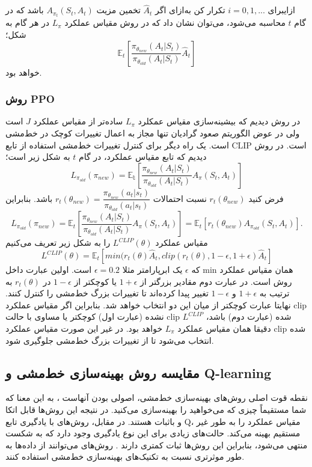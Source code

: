 ‌ازای{برای 
	$i=0,1,...$
	 تکرار کن}
‌به‌ازای
اگر $\hat{A}_t$ تخمین مزیت 
$A_{\pi_t}(S_t, A_t)$
باشد که در گام $t$ محاسبه می‌شود، می‌توان نشان داد که در روش
  مقیاس عملکرد $L_\pi$ در هر گام به شکل؛
$$\mathbb{E}_t\left[\dfrac{\pi_{\theta_{new}}(A_t| S_t)}{\pi_{\theta_{old}}(A_t|S_t)} \hat{A}_t \right]$$خواهد بود.
\subsubsection{روش PPO}
در روش  دیدیم که بیشینه‌سازی مقیاس عمکلرد $L_\pi$ ساده‌تر از مقیاس عملکرد $J$ است ولی در عوض الگوریتم صعود گرادیان تنها مجاز به اعمال تغییرات کوچک در خط‌مشی است. یک راه دیگر برای کنترل تغییرات خط‌مشی استفاده از تابع CLIP است. در روش
  دیدیم که تابع مقیاس عملکرد، در گام $t$ به شکل زیر است؛
$$L_{\pi_{old}}(\pi_{new}) = \mathbb{E_t}\left[\dfrac{\pi_{\theta_{new}}(A_t| S_t)}{\pi_{\theta_{old}}(A_t|S_t)} A_{\pi}(S_t, A_t)\right]$$
فرض کنید 
$r_t(\theta_{new})$
 نسبت احتمالات 
$r_t(\theta_{new}) = \dfrac{\pi_{\theta_{new}}(a_t|s_t)}{\pi_{\theta_{old}}(a_t|s_t)}$ باشد. بنابراین
$$L_{\pi_{old}}(\pi_{new}) = \mathbb{E}_t\left[\dfrac{\pi_{\theta_{new}}(A_t| S_t)}{\pi_{\theta_{old}}(A_t|S_t)} A_{\pi}(S_t, A_t)\right] = \mathbb{E}_t\left[r_t(\theta_{new}) A_{\pi_{old}}(S_t,A_t)\right].$$ مقیاس عملکرد  $L^{CLIP}(\theta)$ را به شکل زیر تعریف می‌کنیم
$$L^{CLIP}(\theta) = \mathbb{E}_t\left[min(r_t(\theta) \hat{A}_t, clip(r_t(\theta), 1-\epsilon, 1+\epsilon) \hat{A}_t \right]$$
که $\epsilon$ یک ابرپارامتر  مثلا 
$\epsilon=0.2$
است. اولین عبارت داخل min همان مقیاس عملکرد روش  است. در عبارت دوم مقادیر بزرگتر از $1+\epsilon$ یا کوچکتر از 
$1-\epsilon$
در $r_t(\theta)$ به ترتیب به $1+\epsilon$ و $1-\epsilon$ تغییر پیدا کرده‌اند تا تغییرات بزرگ خط‌مشی را کنترل کنند. نهایتا عبارت کوچکتر از میان این دو انتخاب خواهد شد. بنابراین اگر مقیاس عملکرد clip نشده (عبارت اول) کوچکتر یا مساوی با حالت clip شده (عبارت دوم) باشد، $L^{CLIP}$ دقیقا همان مقیاس عملکرد $L_\pi$ خواهد بود. در غیر این صورت مقیاس عملکرد clip شده انتخاب می‌شود تا از تغییرات بزرگ خط‌مشی جلوگیری شود.
\subsection{مقایسه روش بهینه‌سازی خط‌مشی و Q-learning}
نقطه قوت اصلی روش‌های بهینه‌سازی خط‌مشی، اصولی بودن آنهاست ، به این معنا که شما مستقیماً چیزی که می‌خواهید را بهینه‌سازی می‌کنید. در نتیجه این روش‌ها قابل اتکا و باثبات هستند. در مقابل، روش‌های 
با یادگیری تابع Q، مقیاس عملکرد را به طور غیر مستقیم بهینه می‌کند. حالت‌های زیادی برای این نوع یادگیری وجود دارد که به شکست منتهی می‌شود، بنابراین این روش‌ها  ثبات کمتری دارند 
\cite{suttonbook}.
روش‌های 
 می‌توانند از داده‌ها به طور موثرتری نسبت به تکنیک‌های بهینه‌سازی خط‌مشی استفاده کنند.
